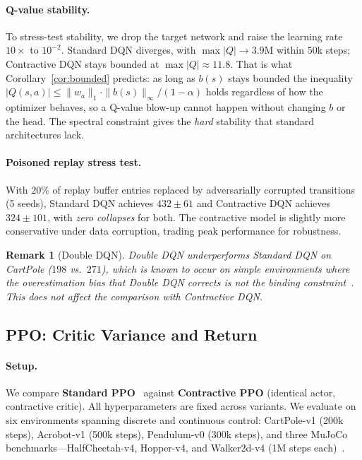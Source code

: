 \documentclass{article}
\newtheorem{remark}{Remark}
\newcommand{\spb}{\alpha}                    %
\begin{document}
\paragraph{Q-value stability.}
To stress-test stability, we drop the target network and raise the learning rate
$10\times$ to $10^{-2}$.
Standard DQN diverges, with $\max |Q| \to 3.9\mathrm{M}$ within $50$k steps;
Contractive DQN stays bounded at $\max |Q| \approx 11.8$.
That is what Corollary~\ref{cor:bounded} predicts: as long as $b(s)$ stays
bounded the inequality $|Q(s,a)| \leq \|w_a\|_1 \cdot \|b(s)\|_\infty / (1-\spb)$
holds regardless of how the optimizer behaves, so a Q-value blow-up cannot
happen without changing $b$ or the head.
The spectral constraint gives the \emph{hard} stability that standard
architectures lack.

\paragraph{Poisoned replay stress test.}
With $20\%$ of replay buffer entries replaced by adversarially corrupted
transitions (5 seeds), Standard DQN achieves $432 \pm 61$ and Contractive DQN
achieves $324 \pm 101$, with \emph{zero collapses} for both.
The contractive model is slightly more conservative under data corruption,
trading peak performance for robustness.

\begin{remark}[Double DQN]
Double DQN underperforms Standard DQN on CartPole ($198$ vs.\ $271$), which is
known to occur on simple environments where the overestimation bias that Double
DQN corrects is not the binding constraint~\citep{van2016deep}.
This does not affect the comparison with Contractive DQN.
\end{remark}

\subsection{PPO: Critic Variance and Return}
\label{sec:exp_ppo}

\paragraph{Setup.}
We compare \textbf{Standard PPO}~\citep{schulman2017proximal} against
\textbf{Contractive PPO} (identical actor, contractive critic).
All hyperparameters are fixed across variants.
We evaluate on six environments spanning discrete and continuous control:
CartPole-v1 (200k steps), Acrobot-v1 (500k steps), Pendulum-v0 (300k steps),
and three MuJoCo benchmarks---HalfCheetah-v4, Hopper-v4, and Walker2d-v4
(1M steps each)~\citep{todorov2012mujoco,brockman2016openai}.
\end{document}
